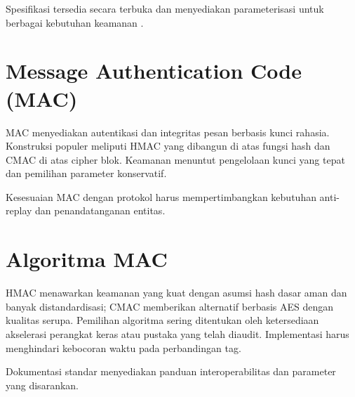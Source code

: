 \documentclass[../main.tex]{subfiles}
\begin{document}
Spesifikasi tersedia secara terbuka dan menyediakan parameterisasi untuk berbagai kebutuhan keamanan \parencite{fips202}.

\section{Message Authentication Code (MAC)}
MAC menyediakan autentikasi dan integritas pesan berbasis kunci rahasia. Konstruksi populer meliputi HMAC yang dibangun di atas fungsi hash dan CMAC di atas cipher blok. Keamanan menuntut pengelolaan kunci yang tepat dan pemilihan parameter konservatif.

Kesesuaian MAC dengan protokol harus mempertimbangkan kebutuhan anti-replay dan penandatanganan entitas.

\section{Algoritma MAC}
HMAC menawarkan keamanan yang kuat dengan asumsi hash dasar aman dan banyak distandardisasi; CMAC memberikan alternatif berbasis AES dengan kualitas serupa. Pemilihan algoritma sering ditentukan oleh ketersediaan akselerasi perangkat keras atau pustaka yang telah diaudit. Implementasi harus menghindari kebocoran waktu pada perbandingan tag.

Dokumentasi standar menyediakan panduan interoperabilitas dan parameter yang disarankan.
\end{document}
